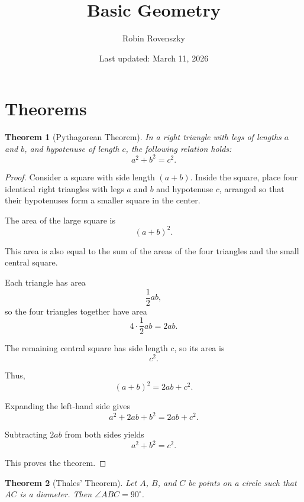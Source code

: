 \documentclass{article}
\title{Basic Geometry}
\author{Robin Rovenszky}
\date{Last updated: March 11, 2026}
\newtheorem{theorem}{Theorem}
\begin{document}
\maketitle
\tableofcontents
\newpage

\section{Theorems}

\begin{theorem}[Pythagorean Theorem]
In a right triangle with legs of lengths $a$ and $b$, and hypotenuse of length $c$, the following relation holds:
\[
a^2 + b^2 = c^2.
\]
\end{theorem}

\begin{proof}
Consider a square with side length $(a+b)$. Inside the square, place four identical right triangles with legs $a$ and $b$ and hypotenuse $c$, arranged so that their hypotenuses form a smaller square in the center.

The area of the large square is
\[
(a+b)^2.
\]

This area is also equal to the sum of the areas of the four triangles and the small central square.

Each triangle has area
\[
\frac{1}{2}ab,
\]
so the four triangles together have area
\[
4 \cdot \frac{1}{2}ab = 2ab.
\]

The remaining central square has side length $c$, so its area is
\[
c^2.
\]

Thus,
\[
(a+b)^2 = 2ab + c^2.
\]

Expanding the left-hand side gives
\[
a^2 + 2ab + b^2 = 2ab + c^2.
\]

Subtracting $2ab$ from both sides yields
\[
a^2 + b^2 = c^2.
\]

This proves the theorem.
\end{proof}


\begin{theorem}[Thales' Theorem]
Let $A$, $B$, and $C$ be points on a circle such that $AC$ is a diameter. 
Then $\angle ABC = 90^\circ$.
\end{theorem}

\begin{center}
\end{center}
\end{document}
